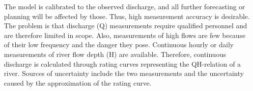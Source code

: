 The model is calibrated to the observed discharge, and all further forecasting or planning will be affected by those. Thus, high measurement accuracy is desirable. The problem is that discharge (Q) measurements require qualified personnel and are therefore limited in scope. Also, measurements of high flows are few because of their low frequency and the danger they pose. Continuous hourly or daily measurements of river flow depth (H) are available. Therefore, continuous discharge is calculated through rating curves representing the QH-relation of a river. Sources of uncertainty include the two measurements and the uncertainty caused by the approximation of the rating curve. 
